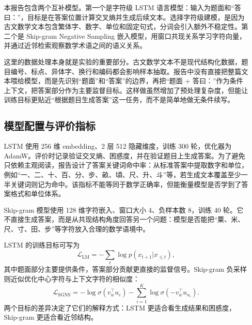 \documentclass[a4paper,11pt,twocolumn]{article}
\begin{document}
本报告包含两个互补模型。第一个是字符级 LSTM 语言模型：输入为题面和“答曰：”，目标是在答案位置计算交叉熵并生成后续文本。选择字符级建模，是因为古文数学文本包含繁体字、数字、单位和固定句式，分词会引入额外不稳定性。第二个是 Skip-gram Negative Sampling 嵌入模型，用窗口共现关系学习字符向量，并通过近邻检索观察数学术语之间的语义关系。

这里的数据处理本身就是实验的重要部分。古文数学文本不是现代结构化数据，题目编号、标点、异体字、换行和编码都会影响样本抽取。报告中没有直接把整篇文本喂给模型，而是先识别“题面”和“答案”的边界，再把“题面 + 答曰：”作为条件上下文，把答案部分作为主要监督目标。这样做虽然增加了预处理复杂度，但能让训练目标更贴近“根据题目生成答案”这一任务，而不是简单地做无条件续写。

\subsection{模型配置与评价指标}

LSTM 使用 256 维 embedding、2 层 512 隐藏维度，训练 300 轮，优化器为 AdamW。评价时记录验证交叉熵、困惑度，并在验证题目上生成答案。为了避免只依赖主观阅读，报告设计了答案关键词命中率：从标准答案中提取数字和单位，例如“一、二、十、百、分、步、畝、頃、尺、升、斗”等，若生成文本覆盖至少一半关键词则记为命中。该指标不能等同于数学正确率，但能衡量模型是否学到了答案格式和单位体系。

Skip-gram 模型使用 128 维字符嵌入、窗口大小 4、负样本数 8，训练 40 轮。它不直接生成答案，而是从共现结构角度回答另一个问题：模型是否能把“粟、米、尺、寸、田、步”等字符放入合理的数学语境中。

LSTM 的训练目标可写为
\[
\mathcal{L}_{\mathrm{LM}}=-\sum_t \log p(x_{t+1}|x_{\leq t}),
\]
其中题面部分主要提供条件，答案部分贡献更直接的监督信号。Skip-gram 负采样则近似优化中心字符与上下文字符的相似度：
\[
\mathcal{L}_{\mathrm{SGNS}}=-\log\sigma(v_w^\top u_c)
-\sum_{i=1}^{K}\log\sigma(-v_w^\top u_{n_i}).
\]
两个目标的差异决定了它们的解释方式：LSTM 更适合看生成结果和困惑度，Skip-gram 更适合看近邻结构。

\begin{table}[H]
\centering
\small
\caption{《九章算术》模型结果}
\end{table}
\end{document}
